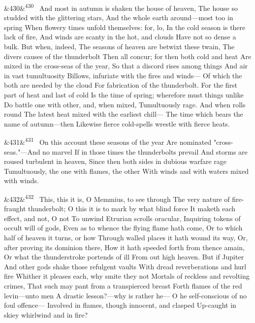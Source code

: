 \documentclass[12pt]{article}
\newcommand{\para}[1][]{\par\noindent\ifx&#1&\else\textsuperscript{\footnotesize #1}~\fi}
\begin{document}
\para[430] And most in autumn is shaken the house of heaven, The house so studded with the glittering stars, And the whole earth around---most too in spring When flowery times unfold themselves: for, lo, In the cold season is there lack of fire, And winds are scanty in the hot, and clouds Have not so dense a bulk. But when, indeed, The seasons of heaven are betwixt these twain, The divers causes of the thunderbolt Then all concur; for then both cold and heat Are mixed in the cross-seas of the year, So that a discord rises among things And air in vast tumultuosity Billows, infuriate with the fires and winds--- Of which the both are needed by the cloud For fabrication of the thunderbolt. For the first part of heat and last of cold Is the time of spring; wherefore must things unlike Do battle one with other, and, when mixed, Tumultuously rage. And when rolls round The latest heat mixed with the earliest chill--- The time which bears the name of autumn---then Likewise fierce cold-spells wrestle with fierce heats.

\para[431] On this account these seasons of the year Are nominated "cross-seas."---And no marvel If in those times the thunderbolts prevail And storms are roused turbulent in heaven, Since then both sides in dubious warfare rage Tumultuously, the one with flames, the other With winds and with waters mixed with winds.

\para[432] This, this it is, O Memmius, to see through The very nature of fire-fraught thunderbolt; O this it is to mark by what blind force It maketh each effect, and not, O not To unwind Etrurian scrolls oracular, Inquiring tokens of occult will of gods, Even as to whence the flying flame hath come, Or to which half of heaven it turns, or how Through walled places it hath wound its way, Or, after proving its dominion there, How it hath speeded forth from thence amain, Or what the thunderstroke portends of ill From out high heaven. But if Jupiter And other gods shake those refulgent vaults With dread reverberations and hurl fire Whither it pleases each, why smite they not Mortals of reckless and revolting crimes, That such may pant from a transpierced breast Forth flames of the red levin---unto men A drastic lesson?---why is rather he--- O he self-conscious of no foul offence--- Involved in flames, though innocent, and clasped Up-caught in skiey whirlwind and in fire?
\end{document}

